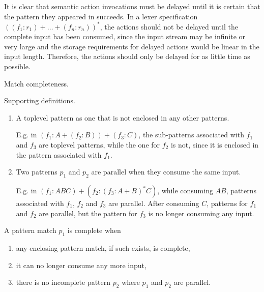 It is clear that semantic action invocations must be delayed until it is certain
that the pattern they appeared in succeeds. In a lexer specification $((f_1:r_1)
+ \dots + (f_n:r_n))^*$, the actions should not be delayed until the complete
input has been consumed, since the input stream may be infinite or very large
and the storage requirements for delayed actions would be linear in the input
length. Therefore, the actions should only be delayed for as little time as
possible.

\begin{defn}
   Match completeness.

   Supporting definitions.
   \begin{enumerate}

      \item A toplevel pattern as one that is not enclosed in any other patterns.
         
         E.g. in $(f_1:A+(f_2:B))+(f_3:C)$, the sub-patterns associated with
         $f_1$ and $f_3$ are toplevel patterns, while the one for $f_2$ is not,
         since it is enclosed in the pattern associated with $f_1$.

      \item Two patterns $p_1$ and $p_2$ are parallel when they consume the same
         input.

         E.g. in $(f_1:ABC)+(f_2:(f_3:A+B)^*C)$, while consuming $AB$, patterns
         associated with $f_1$, $f_2$ and $f_3$ are parallel. After consuming
         $C$, patterns for $f_1$ and $f_2$ are parallel, but the pattern for
         $f_3$ is no longer consuming any input.

   \end{enumerate}

   A pattern match $p_1$ is complete when
   \begin{enumerate}

      \item any enclosing pattern match, if such exists, is complete,

      \item it can no longer consume any more input,

      \item there is no incomplete pattern $p_2$ where $p_1$ and $p_2$ are
         parallel.

   \end{enumerate}

\end{defn}

